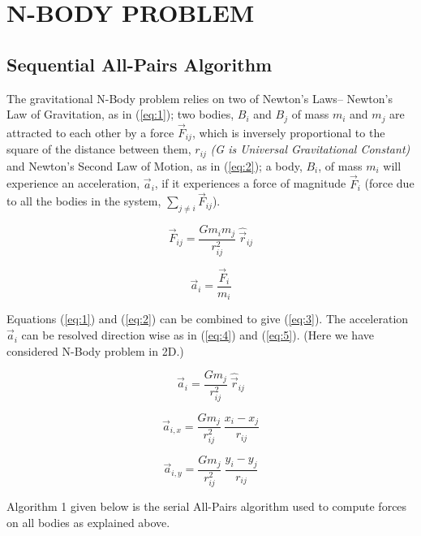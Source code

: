 \documentclass[letterpaper, 10 pt, conference]{ieeeconf}
\begin{document}
\section{N-BODY PROBLEM}

\subsection{Sequential All-Pairs Algorithm}

The gravitational N-Body problem relies on two of Newton's Laws{--} Newton's Law of Gravitation, as in (\ref{eq:1}); two bodies, $B_i$ and $B_j$ of mass $m_i$ and $m_j$ are attracted to each other by a force $\vec{F}_{ij}$, which is inversely proportional to the square of the distance between them, $r_{ij}$ \textit{(G is Universal Gravitational Constant)} and Newton's Second Law of Motion, as in (\ref{eq:2}); a body, $B_i$, of mass $m_i$ will experience an acceleration, $\vec{a}_i$, if it experiences a force of magnitude $\vec{F}_i$ (force due to all the bodies in the system, \(\sum_{j \neq i}\vec{F}_{ij}\)).

\begin{equation} \label{eq:1}
\vec{F}_{ij} = \frac{Gm_im_j}{r_{ij}^2} \: \hat{\vec{r}}_{ij}
\end{equation}

\begin{equation} \label{eq:2}
\vec{a}_i = \frac{\vec{F}_i}{m_i}
\end{equation}

Equations (\ref{eq:1}) and (\ref{eq:2}) can be combined to give (\ref{eq:3}). The acceleration $\vec{a}_i$ can be resolved direction wise as in (\ref{eq:4}) and (\ref{eq:5}). (Here we have considered N-Body problem in 2D.)  

\begin{equation} \label{eq:3}
\vec{a}_i = \frac{Gm_j}{r_{ij}^2} \: 
\hat{\vec{r}}_{ij}
\end{equation}

\begin{equation} \label{eq:4}
\vec{a}_{i, x} = \frac{Gm_j}{r_{ij}^2} \: 
\frac{x_i - x_j}{r_{ij}}
\end{equation}

\begin{equation} \label{eq:5}
\vec{a}_{i, y} = \frac{Gm_j}{r_{ij}^2} \: 
\frac{y_i - y_j}{r_{ij}}
\end{equation}

Algorithm 1 given below is the serial All-Pairs algorithm used to compute forces on all bodies as explained above.
\end{document}
